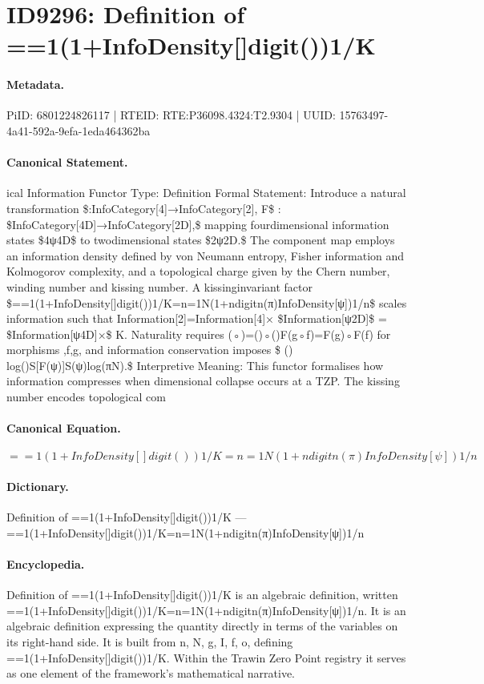 \section*{ID9296: Definition of ==1(1+InfoDensity[]digit())1/K}
\paragraph{Metadata.}
PiID: 6801224826117 | RTEID: RTE:P36098.4324:T2.9304 | UUID: 15763497-4a41-592a-9efa-1eda464362ba

\paragraph{Canonical Statement.}
ical Information Functor Type: Definition Formal Statement: Introduce a natural transformation \$:InfoCategory[4]→InfoCategory[2], F\$ : \$InfoCategory[4D]→InfoCategory[2D],\$ mapping fourdimensional information states \$4ψ4D\$ to twodimensional states \$2ψ2D.\$ The component map employs an information density defined by von Neumann entropy, Fisher information and Kolmogorov complexity, and a topological charge given by the Chern number, winding number and kissing number. A kissinginvariant factor \$==1(1+InfoDensity[]digit())1/K=n=1N(1+ndigitn(π)InfoDensity[ψ])1/n\$ scales information such that Information[2]=Information[4]× \$Information[ψ2D]\$ = \$Information[ψ4D]×\$ K. Naturality requires (◦)=()◦()F(g◦f)=F(g)◦F(f) for morphisms ,f,g, and information conservation imposes \$ () log()S[F(ψ)]S(ψ)log(πN).\$ Interpretive Meaning: This functor formalises how information compresses when dimensional collapse occurs at a TZP. The kissing number encodes topological com

\paragraph{Canonical Equation.}
\[
==1(1+InfoDensity[]digit())1/K=n=1N(1+ndigitn(π)InfoDensity[ψ])1/n
\]

\paragraph{Dictionary.}
Definition of ==1(1+InfoDensity[]digit())1/K — ==1(1+InfoDensity[]digit())1/K=n=1N(1+ndigitn(π)InfoDensity[ψ])1/n

\paragraph{Encyclopedia.}
Definition of ==1(1+InfoDensity[]digit())1/K is an algebraic definition, written ==1(1+InfoDensity[]digit())1/K=n=1N(1+ndigitn(π)InfoDensity[ψ])1/n. It is an algebraic definition expressing the quantity directly in terms of the variables on its right-hand side. It is built from n, N, g, I, f, o, defining ==1(1+InfoDensity[]digit())1/K. Within the Trawin Zero Point registry it serves as one element of the framework's mathematical narrative.

